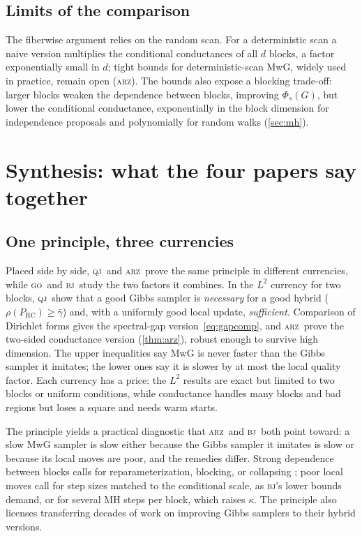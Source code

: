 \documentclass[11pt]{article}
\theoremstyle{remark}
\newcommand{\QJ}{\textsc{qj}}
\newcommand{\ARZ}{\textsc{arz}}
\newcommand{\GO}{\textsc{go}}
\newcommand{\BJ}{\textsc{bj}}
\newcommand{\RC}{\mathrm{RC}}
\begin{document}
\subsection{Limits of the comparison}
The fiberwise argument relies on the random scan. For a deterministic scan a naive version multiplies the conditional conductances of all $d$ blocks, a factor exponentially small in $d$; tight bounds for deterministic-scan MwG, widely used in practice, remain open (\ARZ). The bounds also expose a blocking trade-off: larger blocks weaken the dependence between blocks, improving $\Phi_s(G)$, but lower the conditional conductance, exponentially in the block dimension for independence proposals and polynomially for random walks (\cref{sec:mh}).

\section{Synthesis: what the four papers say together}\label{sec:synthesis}

\subsection{One principle, three currencies}
Placed side by side, \QJ\ and \ARZ\ prove the same principle in different currencies, while \GO\ and \BJ\ study the two factors it combines. In the $L^2$ currency for two blocks, \QJ\ show that a good Gibbs sampler is \emph{necessary} for a good hybrid ($\rho(P_\RC)\ge\bar\gamma$) and, with a uniformly good local update, \emph{sufficient}. Comparison of Dirichlet forms gives the spectral-gap version~\eqref{eq:gapcomp}, and \ARZ\ prove the two-sided conductance version (\cref{thm:arz}), robust enough to survive high dimension. The upper inequalities say MwG is never faster than the Gibbs sampler it imitates; the lower ones say it is slower by at most the local quality factor. Each currency has a price: the $L^2$ results are exact but limited to two blocks or uniform conditions, while conductance handles many blocks and bad regions but loses a square and needs warm starts.

The principle yields a practical diagnostic that \ARZ\ and \BJ\ both point toward: a slow MwG sampler is slow either because the Gibbs sampler it imitates is slow or because its local moves are poor, and the remedies differ. Strong dependence between blocks calls for reparameterization, blocking, or collapsing \citep{roberts1997updating,papaspiliopoulos2007general}; poor local moves call for step sizes matched to the conditional scale, as \BJ's lower bounds demand, or for several MH steps per block, which raises $\kappa$. The principle also licenses transferring decades of work on improving Gibbs samplers to their hybrid versions.
\end{document}
